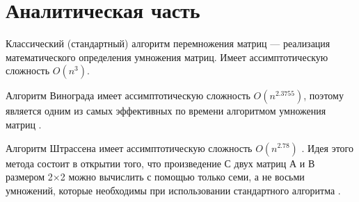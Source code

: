 \section{Аналитическая часть}

Классический (стандартный) алгоритм перемножения матриц --- реализация математического определения умножения матриц.
Имеет ассимптотическую сложность \(O(n^{3})\).

Алгоритм Винограда имеет ассимптотическую сложность \(O(n^{2.3755})\), поэтому является одним из самых эффективных по времени алгоритмом умножения матриц \cite{Виноград}. 

Алгоритм Штрассена имеет ассимптотическую сложность \(O(n^{2.78})\) \cite{Ultra-Fast}. 
Идея этого метода состоит в открытии того, что произведение С двух матриц А и В размером 2×2 можно вычислить с помощью только семи, а не восьми умножений, которые необходимы при использовании стандартного алгоритма \cite{Штрассен}.